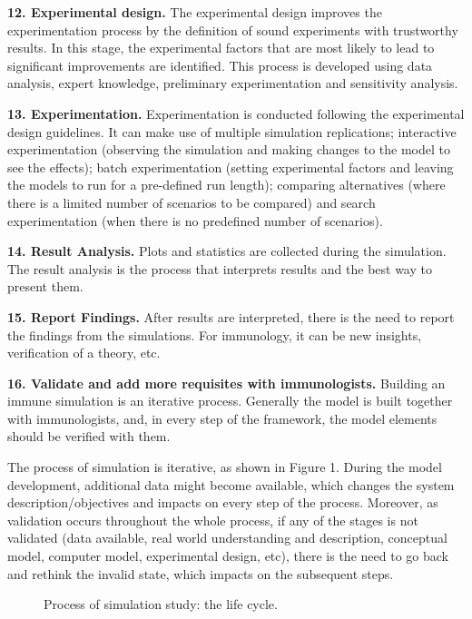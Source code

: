 \documentclass{llncs}
\begin{document}
{\bf 12. Experimental design.} The experimental design improves the experimentation process by the definition of sound experiments with trustworthy results. In this stage, the experimental factors that are most likely to lead to significant improvements are identified. This process is developed using data analysis, expert knowledge, preliminary experimentation and sensitivity analysis.

{\bf 13. Experimentation.} Experimentation is conducted following the experimental design guidelines. It can make use of multiple simulation replications; interactive experimentation (observing the simulation and making changes to the model to see the effects); batch experimentation (setting experimental factors and leaving the models to run for a pre-defined run length); comparing alternatives (where there is a limited number of scenarios to be compared) and search experimentation (when there is no predefined number of scenarios).

{\bf 14. Result Analysis.} Plots and statistics are collected during the simulation. The result analysis is the process that interprets results and the best way to present them.

{\bf 15. Report Findings.} After results are interpreted, there is the need to report the findings from the simulations. For immunology, it can be new insights, verification of a theory, etc.

{\bf 16. Validate and add more requisites with immunologists.} Building an immune simulation is an iterative process. Generally the model is built together with immunologists, and, in every step of the framework, the model elements should be verified with them.

The process of simulation is iterative, as shown in Figure 1. During the model development, additional data might become available, which changes the system description/objectives and impacts on every step of the process. Moreover, as validation occurs throughout the whole process, if any of the stages is not validated (data available, real world understanding and description, conceptual model, computer model, experimental design, etc), there is the need to go back and rethink the invalid state, which impacts on the subsequent steps.

\begin{figure}[!h]
  \vspace{-0.2cm}
  \centering
   {}
   \vspace{-20pt}
  \caption{Process of simulation study: the life cycle.}
  \vspace{-10pt}
  \label{fig:steps}
 \end{figure}
\end{document}
